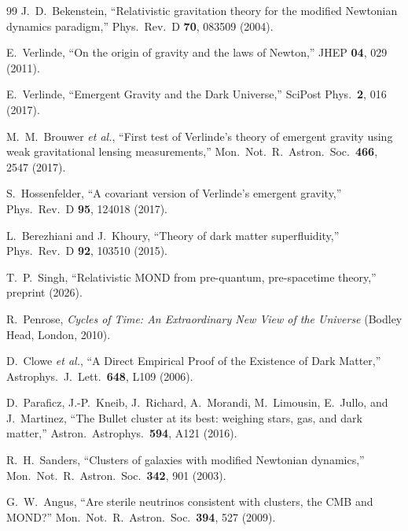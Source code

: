 \documentclass[11pt]{article}
\begin{document}
\begin{thebibliography}{99}
J.~D.~Bekenstein,
``Relativistic gravitation theory for the modified Newtonian dynamics paradigm,''
Phys.\ Rev.\ D \textbf{70}, 083509 (2004).

E.~Verlinde,
``On the origin of gravity and the laws of Newton,''
JHEP \textbf{04}, 029 (2011).

E.~Verlinde,
``Emergent Gravity and the Dark Universe,''
SciPost Phys.\ \textbf{2}, 016 (2017).

M.~M.~Brouwer \textit{et al.},
``First test of Verlinde's theory of emergent gravity using weak gravitational lensing measurements,''
Mon.\ Not.\ R.\ Astron.\ Soc.\ \textbf{466}, 2547 (2017).

S.~Hossenfelder,
``A covariant version of Verlinde's emergent gravity,''
Phys.\ Rev.\ D \textbf{95}, 124018 (2017).

L.~Berezhiani and J.~Khoury,
``Theory of dark matter superfluidity,''
Phys.\ Rev.\ D \textbf{92}, 103510 (2015).

T.~P.~Singh,
``Relativistic MOND from pre-quantum, pre-spacetime theory,''
preprint (2026).

R.~Penrose,
\textit{Cycles of Time: An Extraordinary New View of the Universe}
(Bodley Head, London, 2010).

D.~Clowe \textit{et al.},
``A Direct Empirical Proof of the Existence of Dark Matter,''
Astrophys.\ J.\ Lett.\ \textbf{648}, L109 (2006).

D.~Paraficz, J.-P.~Kneib, J.~Richard, A.~Morandi,
M.~Limousin, E.~Jullo, and J.~Martinez,
``The Bullet cluster at its best: weighing stars, gas, and dark matter,''
Astron.\ Astrophys.\ \textbf{594}, A121 (2016).

R.~H.~Sanders,
``Clusters of galaxies with modified Newtonian dynamics,''
Mon.\ Not.\ R.\ Astron.\ Soc.\ \textbf{342}, 901 (2003).

G.~W.~Angus,
``Are sterile neutrinos consistent with clusters, the CMB and MOND?''
Mon.\ Not.\ R.\ Astron.\ Soc.\ \textbf{394}, 527 (2009).

\end{thebibliography}
\end{document}
